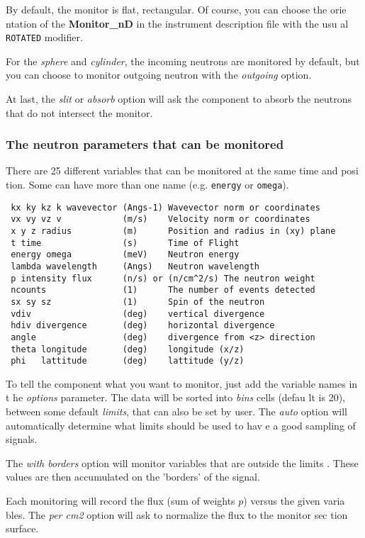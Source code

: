 \documentclass[12pt]{report}
\begin{document}
By default, the monitor is flat, rectangular. Of course, you can choose the orie
ntation of the {\bf Monitor\_nD} in the instrument description file with the usu
al \texttt{ROTATED} modifier.

For the {\it sphere} and {\it cylinder}, the incoming neutrons are monitored by 
default, but you can choose to monitor outgoing neutron with the {\it outgoing} 
option.

At last, the {\it slit} or {\it absorb} option will ask the component to absorb 
the neutrons that do not intersect the monitor.

\subsubsection{The neutron parameters that can be monitored}

There are 25 different variables that can be monitored at the same time and posi
tion. Some can have more than one name (e.g. \texttt{energy} or \texttt{omega}).


\begin{verbatim}
 kx ky kz k wavevector (Angs-1) Wavevector norm or coordinates
 vx vy vz v            (m/s)    Velocity norm or coordinates
 x y z radius          (m)      Position and radius in (xy) plane
 t time                (s)      Time of Flight
 energy omega          (meV)    Neutron energy
 lambda wavelength     (Angs)   Neutron wavelength
 p intensity flux      (n/s) or (n/cm^2/s) The neutron weight
 ncounts               (1)      The number of events detected
 sx sy sz              (1)      Spin of the neutron
 vdiv                  (deg)    vertical divergence
 hdiv divergence       (deg)    horizontal divergence
 angle                 (deg)    divergence from <z> direction
 theta longitude       (deg)    longitude (x/z)
 phi   lattitude       (deg)    lattitude (y/z)
\end{verbatim}

To tell the component what you want to monitor, just add the variable names in t
he {\it options} parameter. The data will be sorted into {\it bins} cells (defau
lt is 20), between some default {\it limits}, that can also be set by user. The 
{\it auto} option will automatically determine what limits should be used to hav
e a good sampling of signals.

The {\it with borders} option will monitor variables that are outside the limits
. These values are then accumulated on the 'borders' of the signal.

Each monitoring will record the flux (sum of weights $p$) versus the given varia
bles. The {\it per cm2} option will ask to normalize the flux to the monitor sec
tion surface.
\end{document}
